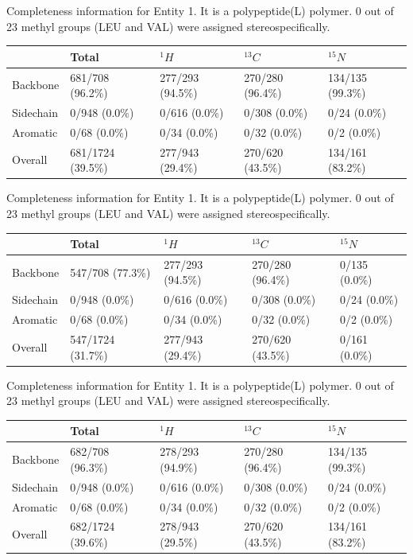 Completeness information for Entity 1. It is a polypeptide(L) polymer. 0 out of 23 methyl groups (LEU and VAL) were assigned stereospecifically.\begin{longtable}{|l|l|l|l|l|}
\hline
  & Total & $^{1}H$ & $^{13}C$ & $^{15}N$\\\hline
Backbone & 681/708 (96.2\%)& 277/293 (94.5\%)& 270/280 (96.4\%)& 134/135 (99.3\%) \\
\hline
Sidechain & 0/948 (0.0\%)& 0/616 (0.0\%)& 0/308 (0.0\%)& 0/24 (0.0\%) \\
\hline
Aromatic & 0/68 (0.0\%)& 0/34 (0.0\%)& 0/32 (0.0\%)& 0/2 (0.0\%) \\
\hline
Overall & 681/1724 (39.5\%)& 277/943 (29.4\%)& 270/620 (43.5\%)& 134/161 (83.2\%) \\
\hline
\end{longtable}
Completeness information for Entity 1. It is a polypeptide(L) polymer. 0 out of 23 methyl groups (LEU and VAL) were assigned stereospecifically.\begin{longtable}{|l|l|l|l|l|}
\hline
  & Total & $^{1}H$ & $^{13}C$ & $^{15}N$\\\hline
Backbone & 547/708 (77.3\%)& 277/293 (94.5\%)& 270/280 (96.4\%)& 0/135 (0.0\%) \\
\hline
Sidechain & 0/948 (0.0\%)& 0/616 (0.0\%)& 0/308 (0.0\%)& 0/24 (0.0\%) \\
\hline
Aromatic & 0/68 (0.0\%)& 0/34 (0.0\%)& 0/32 (0.0\%)& 0/2 (0.0\%) \\
\hline
Overall & 547/1724 (31.7\%)& 277/943 (29.4\%)& 270/620 (43.5\%)& 0/161 (0.0\%) \\
\hline
\end{longtable}
Completeness information for Entity 1. It is a polypeptide(L) polymer. 0 out of 23 methyl groups (LEU and VAL) were assigned stereospecifically.\begin{longtable}{|l|l|l|l|l|}
\hline
  & Total & $^{1}H$ & $^{13}C$ & $^{15}N$\\\hline
Backbone & 682/708 (96.3\%)& 278/293 (94.9\%)& 270/280 (96.4\%)& 134/135 (99.3\%) \\
\hline
Sidechain & 0/948 (0.0\%)& 0/616 (0.0\%)& 0/308 (0.0\%)& 0/24 (0.0\%) \\
\hline
Aromatic & 0/68 (0.0\%)& 0/34 (0.0\%)& 0/32 (0.0\%)& 0/2 (0.0\%) \\
\hline
Overall & 682/1724 (39.6\%)& 278/943 (29.5\%)& 270/620 (43.5\%)& 134/161 (83.2\%) \\
\hline
\end{longtable}
